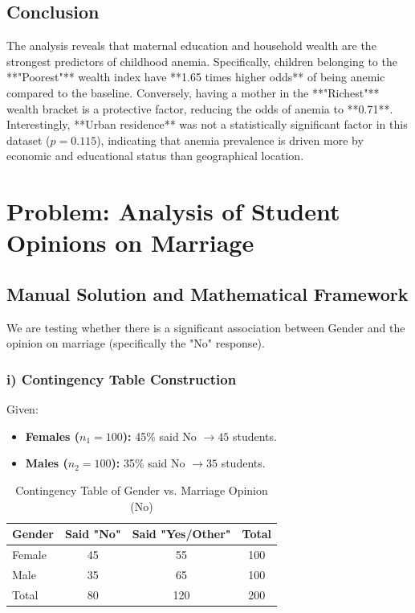 \documentclass[12pt]{article}
\begin{document}
\subsection{Conclusion}
The analysis reveals that maternal education and household wealth are the strongest predictors of childhood anemia. Specifically, children belonging to the **"Poorest"** wealth index have **1.65 times higher odds** of being anemic compared to the baseline. Conversely, having a mother in the **"Richest"** wealth bracket is a protective factor, reducing the odds of anemia to **0.71**. Interestingly, **Urban residence** was not a statistically significant factor in this dataset ($p = 0.115$), indicating that anemia prevalence is driven more by economic and educational status than geographical location.

\newpage
\section{Problem: Analysis of Student Opinions on Marriage}
\label{prob_marriage}

\subsection{Manual Solution and Mathematical Framework}
We are testing whether there is a significant association between Gender and the opinion on marriage (specifically the "No" response).

\subsubsection{i) Contingency Table Construction}
Given:
\begin{itemize}
    \item \textbf{Females ($n_1 = 100$):} 45\% said No $\rightarrow 45$ students.
    \item \textbf{Males ($n_2 = 100$):} 35\% said No $\rightarrow 35$ students.
\end{itemize}

\begin{table}[h!]
\centering
\caption{Contingency Table of Gender vs. Marriage Opinion (No)}
\begin{tabular}{@{}lccc@{}}
\toprule
Gender & Said "No" & Said "Yes/Other" & Total \\ \midrule
Female & 45 & 55 & 100 \\
Male & 35 & 65 & 100 \\ \midrule
Total & 80 & 120 & 200 \\ \bottomrule
\end{tabular}
\end{table}
\end{document}
